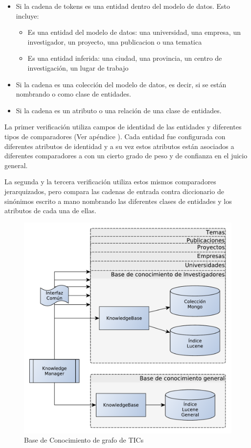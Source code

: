 \begin{itemize}
  \item Si la cadena de tokens es una entidad dentro del modelo de datos. Esto incluye:
    \begin{itemize}
      \item Es una entidad del modelo de datos: una universidad, una empresa, un investigador, un proyecto, una publicacion o una tematica
      \item Es una entidad inferida: una ciudad, una provincia, un centro de investigación, un lugar de trabajo
    \end{itemize}
  \item Si la cadena es una colección del modelo de datos, es decir, si se están nombrando  o  como clase de entidades.
  \item Si la cadena es un atributo o una relación de una clase de entidades.
\end{itemize}

La primer verificación utiliza campos de identidad de las entidades y diferentes tipos de comparadores (Ver apéndice  ). Cada entidad fue configurada con diferentes atributos de identidad y a su vez estos atributos están asociados a diferentes comparadores a con un cierto grado de peso y de confianza en el juicio general. 

La segunda y la tercera verificación utiliza estos mismos comparadores jerarquizados, pero compara las cadenas de entrada contra diccionario de sinónimos escrito a mano nombrando las diferentes clases de entidades y los atributos de cada una de ellas. 

\begin{figure}[H]
  \centering
    \includegraphics[scale=0.5]{graficos/KnowledgeManager}
  \caption{Base de Conocimiento de grafo de TICs}
  \label{fig:KnowledgeManager}
\end{figure}

